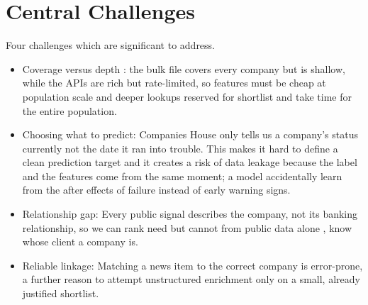 \documentclass[ %
                    author={Daniel Page},
                supervisor={Dr. Andrew Calway},
                    degree={MSc},
                     title={Some Structural Guidelines for Data Science MSc Theses, Including Those With Long Titles that Run Across Multiple Lines on the Front Page},
                  subtitle={And those including an optional subtitle too, for good measure},
                      type={},
                      year={2021}]{dissertation}
\begin{document}
\section{Central Challenges}
Four challenges which are significant to address.
\begin{itemize}
    \item Coverage versus depth : the bulk file covers every company but is shallow, while the APIs are rich but rate-limited, so features must be cheap at population scale and deeper lookups reserved for shortlist and take time for the entire population.
    \item Choosing what to predict: Companies House only tells us a company's status currently not the date it ran into trouble. This makes it hard to define a clean prediction target and it creates a risk of data leakage because the label and the features come from the same moment; a model accidentally learn from the after effects of failure instead of early warning signs.
    \item Relationship gap:  Every public signal describes the company, not its banking relationship, so we can rank need but cannot from public data alone , know whose client a company is.
    \item Reliable linkage: Matching a news item to the correct company is error-prone, a further reason to attempt unstructured enrichment only on a small, already justified shortlist.
\end{itemize}
\end{document}
